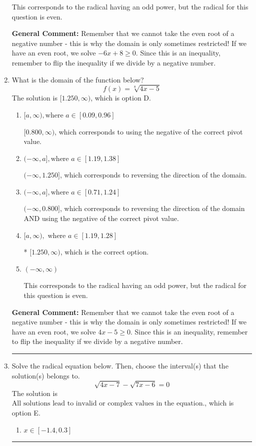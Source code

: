 \documentclass{extbook}[14pt]
\newcommand{\litem}[1]{\item #1

\rule{\textwidth}{0.4pt}}
\begin{document}
\begin{enumerate}
{\begin{enumerate}[label=\Alph*.]
This corresponds to the radical having an odd power, but the radical for this question is even.
\end{enumerate}

\textbf{General Comment:} Remember that we cannot take the even root of a negative number - this is why the domain is only sometimes restricted! If we have an even root, we solve $-6 x + 8 \geq 0$. Since this is an inequality, remember to flip the inequality if we divide by a negative number.
}
\litem{
What is the domain of the function below?
\[ f(x) = \sqrt[8]{4 x - 5} \]The solution is \( [1.250, \infty) \), which is option D.\begin{enumerate}[label=\Alph*.]
\item \( [a, \infty), \text{where } a \in [0.09, 0.96] \)

$[0.800, \infty)$, which corresponds to using the negative of the correct pivot value.
\item \( (-\infty, a], \text{where } a \in [1.19, 1.38] \)

 $(-\infty, 1.250]$, which corresponds to reversing the direction of the domain.
\item \( (-\infty, a], \text{where } a \in [0.71, 1.24] \)

$(-\infty, 0.800]$, which corresponds to reversing the direction of the domain AND using the negative of the correct pivot value.
\item \( [a, \infty), \text{ where } a \in [1.19, 1.28] \)

* $[1.250, \infty)$, which is the correct option.
\item \( (-\infty, \infty) \)

This corresponds to the radical having an odd power, but the radical for this question is even.
\end{enumerate}

\textbf{General Comment:} Remember that we cannot take the even root of a negative number - this is why the domain is only sometimes restricted! If we have an even root, we solve $4 x - 5 \geq 0$. Since this is an inequality, remember to flip the inequality if we divide by a negative number.
}
\litem{
Solve the radical equation below. Then, choose the interval(s) that the solution(s) belongs to.
\[ \sqrt{4 x - 7} - \sqrt{7 x - 6} = 0 \]The solution is \( \text{All solutions lead to invalid or complex values in the equation.} \), which is option E.\begin{enumerate}[label=\Alph*.]
\item \( x \in [-1.4,0.3] \)


\end{enumerate}}
\end{enumerate}
\end{document}
